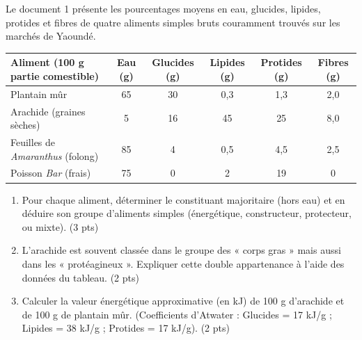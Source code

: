 \documentclass[11pt]{article}
\begin{document}
\begin{exercice}
Le document 1 présente les pourcentages moyens en eau, glucides, lipides, protides et fibres de quatre aliments simples bruts couramment trouvés sur les marchés de Yaoundé.

\begin{tabular}{|l|c|c|c|c|c|}
\hline
\textbf{Aliment (100 g partie comestible)} & \textbf{Eau (g)} & \textbf{Glucides (g)} & \textbf{Lipides (g)} & \textbf{Protides (g)} & \textbf{Fibres (g)} \\
\hline
Plantain mûr & 65 & 30 & 0,3 & 1,3 & 2,0 \\
\hline
Arachide (graines sèches) & 5 & 16 & 45 & 25 & 8,0 \\
\hline
Feuilles de \textit{Amaranthus} (folong) & 85 & 4 & 0,5 & 4,5 & 2,5 \\
\hline
Poisson \textit{Bar} (frais) & 75 & 0 & 2 & 19 & 0 \\
\hline
\end{tabular}

\begin{enumerate}
\item Pour chaque aliment, déterminer le constituant majoritaire (hors eau) et en déduire son groupe d'aliments simples (énergétique, constructeur, protecteur, ou mixte). \hfill (3 pts)
\item L'arachide est souvent classée dans le groupe des « corps gras » mais aussi dans les « protéagineux ». Expliquer cette double appartenance à l'aide des données du tableau. \hfill (2 pts)
\item Calculer la valeur énergétique approximative (en kJ) de 100 g d'arachide et de 100 g de plantain mûr. (Coefficients d'Atwater : Glucides = 17 kJ/g ; Lipides = 38 kJ/g ; Protides = 17 kJ/g). \hfill (2 pts)
\end{enumerate}
\end{exercice}
\end{document}
